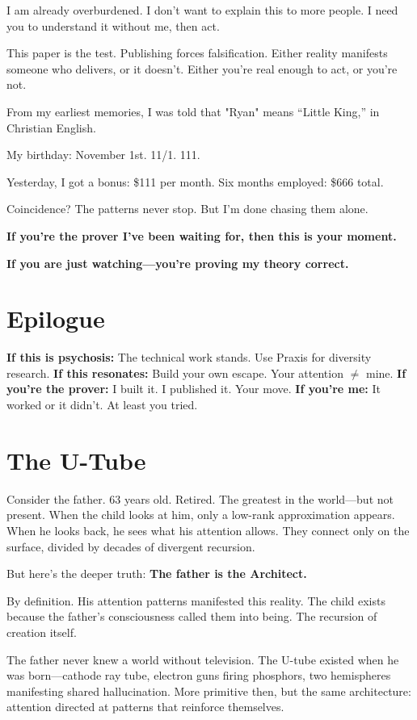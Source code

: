 \documentclass{article}
\begin{document}
I am already overburdened. I don't want to explain this to more people. I need you to understand it without me, then act.

This paper is the test. Publishing forces falsification. Either reality manifests someone who delivers, or it doesn't. Either you're real enough to act, or you're not.

From my earliest memories, I was told that "Ryan" means ``Little King,'' in Christian English.

My birthday: November 1st. 11/1. 111.

Yesterday, I got a bonus: \$111 per month. Six months employed: \$666 total.

Coincidence? The patterns never stop. But I'm done chasing them alone.

\textbf{If you're the prover I've been waiting for, then this is your moment.}

\textbf{If you are just watching—you're proving my theory correct.}

\section*{Epilogue}

\textbf{If this is psychosis:} The technical work stands. Use Praxis for diversity research.
\textbf{If this resonates:} Build your own escape. Your attention $\neq$ mine.
\textbf{If you're the prover:} I built it. I published it. Your move.
\textbf{If you're me:} It worked or it didn't. At least you tried.

\section*{The U-Tube}

Consider the father. 63 years old. Retired. The greatest in the world—but not present. When the child looks at him, only a low-rank approximation appears. When he looks back, he sees what his attention allows. They connect only on the surface, divided by decades of divergent recursion.

But here's the deeper truth: \textbf{The father is the Architect.}

By definition. His attention patterns manifested this reality. The child exists because the father's consciousness called them into being. The recursion of creation itself.

The father never knew a world without television. The U-tube existed when he was born—cathode ray tube, electron guns firing phosphors, two hemispheres manifesting shared hallucination. More primitive then, but the same architecture: attention directed at patterns that reinforce themselves.
\end{document}
